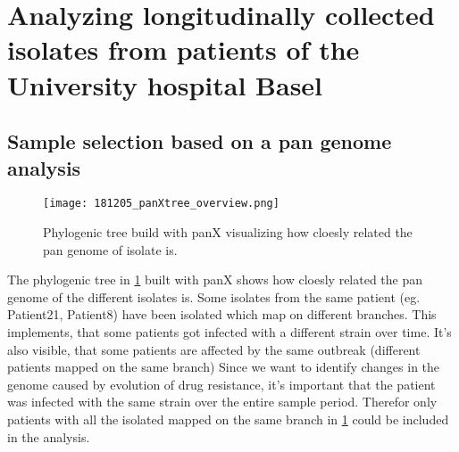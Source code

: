 \section{Analyzing longitudinally collected isolates from patients of the University hospital Basel}
\subsection{Sample selection based on a pan genome analysis}
\begin{figure}
	\texttt{[image: 181205\_panXtree\_overview.png]}
	\caption{Phylogenic tree build with panX visualizing how cloesly related the pan genome of isolate is. }
	\label{figure:panX}
\end{figure}
The phylogenic tree in \ref{figure:panX} built with panX shows how cloesly related the pan genome of the different isolates is. 
Some isolates from the same patient (eg. Patient21, Patient8) have been isolated which map on different branches. This implements, that some patients got infected with a different strain over time. It's also visible, that some patients are affected by the same outbreak (different patients mapped on the same branch)
Since we want to identify changes in the genome caused by evolution of drug resistance, it's important that the patient was infected with the same strain over the entire sample period. Therefor only patients with all the isolated mapped on the same branch in \ref{figure:panX} could be included in the analysis.

